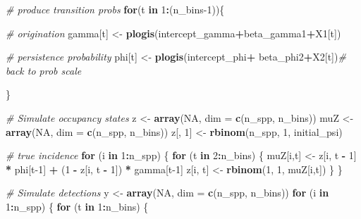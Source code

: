 \documentclass[
]{article}
\newenvironment{Shaded}{\begin{snugshade}}{\end{snugshade}}
\newcommand{\AttributeTok}[1]{\textcolor[rgb]{0.13,0.29,0.53}{#1}}
\newcommand{\CommentTok}[1]{\textcolor[rgb]{0.56,0.35,0.01}{\textit{#1}}}
\newcommand{\ConstantTok}[1]{\textcolor[rgb]{0.56,0.35,0.01}{#1}}
\newcommand{\ControlFlowTok}[1]{\textcolor[rgb]{0.13,0.29,0.53}{\textbf{#1}}}
\newcommand{\DecValTok}[1]{\textcolor[rgb]{0.00,0.00,0.81}{#1}}
\newcommand{\FunctionTok}[1]{\textcolor[rgb]{0.13,0.29,0.53}{\textbf{#1}}}
\newcommand{\NormalTok}[1]{#1}
\newcommand{\OtherTok}[1]{\textcolor[rgb]{0.56,0.35,0.01}{#1}}
\newcommand{\SpecialCharTok}[1]{\textcolor[rgb]{0.81,0.36,0.00}{\textbf{#1}}}
\begin{document}
{\begin{Shaded}
\begin{Highlighting}[]
        \CommentTok{\# produce transition probs}
        \ControlFlowTok{for}\NormalTok{(t }\ControlFlowTok{in} \DecValTok{1}\SpecialCharTok{:}\NormalTok{(n\_bins}\DecValTok{{-}1}\NormalTok{))\{}
          
            \CommentTok{\# origination }
\NormalTok{            gamma[t] }\OtherTok{\textless{}{-}} \FunctionTok{plogis}\NormalTok{(intercept\_gamma}\SpecialCharTok{+}\NormalTok{beta\_gamma1}\SpecialCharTok{+}\NormalTok{X1[t])}
            
            \CommentTok{\# persistence probability}
\NormalTok{            phi[t] }\OtherTok{\textless{}{-}} \FunctionTok{plogis}\NormalTok{(intercept\_phi}\SpecialCharTok{+}
\NormalTok{                                    beta\_phi2}\SpecialCharTok{+}\NormalTok{X2[t])}\CommentTok{\# back to prob scale}
            
            
\NormalTok{        \}}
        
        \CommentTok{\# Simulate occupancy states}
\NormalTok{        z }\OtherTok{\textless{}{-}} \FunctionTok{array}\NormalTok{(}\ConstantTok{NA}\NormalTok{, }\AttributeTok{dim =} \FunctionTok{c}\NormalTok{(n\_spp, n\_bins))}
\NormalTok{        muZ }\OtherTok{\textless{}{-}} \FunctionTok{array}\NormalTok{(}\ConstantTok{NA}\NormalTok{, }\AttributeTok{dim =} \FunctionTok{c}\NormalTok{(n\_spp, n\_bins))}
\NormalTok{        z[, }\DecValTok{1}\NormalTok{] }\OtherTok{\textless{}{-}} \FunctionTok{rbinom}\NormalTok{(n\_spp, }\DecValTok{1}\NormalTok{, initial\_psi)}
        
        \CommentTok{\# true incidence}
        \ControlFlowTok{for}\NormalTok{ (i }\ControlFlowTok{in} \DecValTok{1}\SpecialCharTok{:}\NormalTok{n\_spp) \{}
            \ControlFlowTok{for}\NormalTok{ (t }\ControlFlowTok{in} \DecValTok{2}\SpecialCharTok{:}\NormalTok{n\_bins) \{}
\NormalTok{              muZ[i,t] }\OtherTok{\textless{}{-}}\NormalTok{ z[i, t }\SpecialCharTok{{-}} \DecValTok{1}\NormalTok{] }\SpecialCharTok{*}\NormalTok{ phi[t}\DecValTok{{-}1}\NormalTok{] }\SpecialCharTok{+}\NormalTok{ (}\DecValTok{1} \SpecialCharTok{{-}}\NormalTok{ z[i, t }\SpecialCharTok{{-}} \DecValTok{1}\NormalTok{]) }\SpecialCharTok{*}\NormalTok{ gamma[t}\DecValTok{{-}1}\NormalTok{]}
\NormalTok{              z[i, t] }\OtherTok{\textless{}{-}} \FunctionTok{rbinom}\NormalTok{(}\DecValTok{1}\NormalTok{, }\DecValTok{1}\NormalTok{, muZ[i,t])}
\NormalTok{          \}}
\NormalTok{        \}}
        
        \CommentTok{\# Simulate detections}
\NormalTok{        y }\OtherTok{\textless{}{-}} \FunctionTok{array}\NormalTok{(}\ConstantTok{NA}\NormalTok{, }\AttributeTok{dim =} \FunctionTok{c}\NormalTok{(n\_spp, n\_bins))}
        \ControlFlowTok{for}\NormalTok{ (i }\ControlFlowTok{in} \DecValTok{1}\SpecialCharTok{:}\NormalTok{n\_spp) \{}
          \ControlFlowTok{for}\NormalTok{ (t }\ControlFlowTok{in} \DecValTok{1}\SpecialCharTok{:}\NormalTok{n\_bins) \{}
            

\end{Highlighting}
\end{Shaded}}
\end{document}
